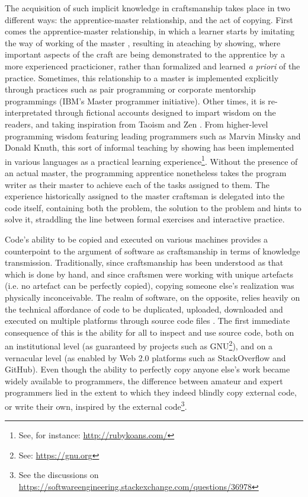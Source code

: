 The acquisition of such implicit knowledge in craftsmanship takes place in two different ways: the apprentice-master relationship, and the act of copying. First comes the apprentice-master relationship, in which a learner starts by  imitating the way of working of the master \citep{sennett_craftsman_2009}, resulting in ateaching by showing, where important aspects of the craft are being demonstrated to the apprentice by a more experienced practicioner, rather than formalized and learned \emph{a priori} of the practice. Sometimes, this relationship to a master is implemented explicitly through practices such as pair programming \citep{williams_pair_2003} or corporate mentorship programmings (IBM's Master programmer initiative). Other times, it is re-interpretated through fictional accounts designed to impart wisdom on the readers, and taking inspiration from Taoism and Zen \citep{james_tao_1987,raymond_new_1996}. From higher-level programming wisdom featuring leading programmers such as Marvin Minsky and Donald Knuth, this sort of informal teaching by showing has been implemented in various languages as a practical learning experience\footnote{See, for instance: \url{http://rubykoans.com/}}. Without the presence of an actual master, the programming apprentice nonetheless takes the program writer as their master to achieve each of the tasks assigned to them. The experience historically assigned to the master craftsman is delegated into the code itself, containing both the problem, the solution to the problem and hints to solve it, straddling the line between formal exercises and interactive practice.

Code's ability to be copied and executed on various machines provides a counterpoint to the argument of software as craftsmanship in terms of knowledge transmission. Traditionally, since craftsmanship has been understood as that which is done by hand, and since craftsmen were working with unique artefacts (i.e. no artefact can be perfectly copied), copying someone else's realization was physically inconceivable. The realm of software, on the opposite, relies heavily on the technical affordance of code to be duplicated, uploaded, downloaded and executed on multiple platforms through source code files \citep{manovich_language_2001}. The first immediate consequence of this is the ability for all to inspect and use source code, both on an institutional level (as guaranteed by projects such as GNU\footnote{See: \url{https://gnu.org}}), and on a vernacular level (as enabled by Web 2.0 platforms such as StackOverflow and GitHub). Even though the ability to perfectly copy anyone else's work became widely available to programmers, the difference between amateur and expert programmers lied in the extent to which they indeed blindly copy external code, or write their own, inspired by the external code\footnote{See the discussions on \url{https://softwareengineering.stackexchange.com/questions/36978}}.

